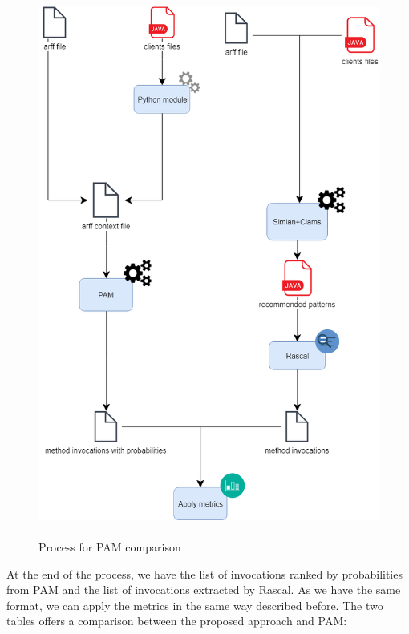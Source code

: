 \begin{figure}[!h]
\includegraphics[width=18cm,height=18cm,keepaspectratio]{images/PAM.png}
\centering
  \caption{Process for PAM comparison}
  \label{fig:cmd}
\end{figure}
 At the end of the process, we have the list of invocations ranked by probabilities from PAM and the list of invocations extracted by Rascal. As we have the same format, we can apply the metrics in the same way described before. The two tables offers a comparison between the proposed approach and PAM: 


